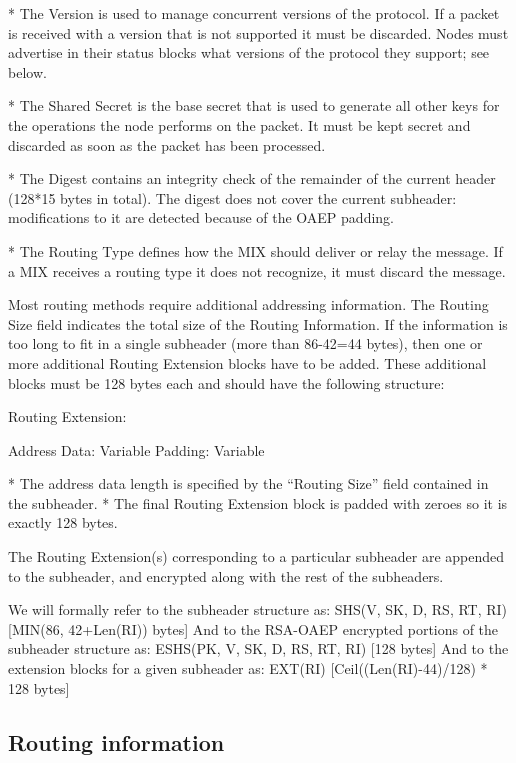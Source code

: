 * The Version is used to manage concurrent versions of the
protocol. If a packet is received with a version that is not supported
it must be discarded. Nodes must advertise in their status blocks what
versions of the protocol they support; see below.

* The Shared Secret is the base secret that is used to generate all
other keys for the operations the node performs on the packet. It must be
kept secret and discarded as soon as the packet has been processed. 

* The Digest contains an integrity check of the remainder of the current
header (128*15 bytes in total). The digest does not cover the current
subheader: modifications to it are detected because of the OAEP padding.

* The Routing Type defines how the MIX should deliver or relay the
  message. If a MIX receives a routing type it does not recognize,
  it must discard the message.

  Most routing methods require additional addressing information.
  The Routing Size field indicates the total size of the Routing
  Information. If the information is too long to fit in a single
  subheader (more than 86-42=44 bytes), then one or more additional
  Routing Extension blocks have to be added. These additional blocks
  must be 128 bytes each and should have the following structure:
 
  Routing Extension:

    Address Data:     Variable
    Padding:          Variable

* The address data length is specified by the ``Routing Size'' field
  contained in the subheader.
* The final Routing Extension block is padded with zeroes so it is
  exactly 128 bytes.

The Routing Extension(s) corresponding to a particular subheader are
appended to the subheader, and encrypted along with the rest of the
subheaders.

We will formally refer to the subheader structure as:
SHS(V, SK, D, RS, RT, RI)     [MIN(86, 42+Len(RI)) bytes] 
And to the RSA-OAEP encrypted portions of the subheader structure as:
ESHS(PK, V, SK, D, RS, RT, RI)   [128 bytes]
And to the extension blocks for a given subheader as:
EXT(RI)                       [Ceil((Len(RI)-44)/128) * 128 bytes]

\subsection{Routing information}

